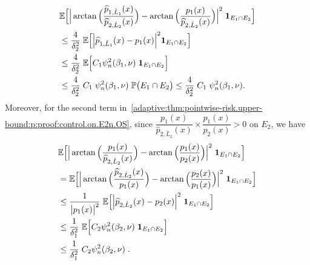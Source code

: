 \documentclass[11pt,a4paper,openany]{article}
\def\E{\mathbb{E}}
\begin{document}
\begin{align*}
	&\E \Big[ \Big| \arctan \Big( \dfrac{ \widehat{p}_{1, \hat L_1}(x)}{ \widehat{p}_{2, \hat L_2}(x)}  \Big)  -  \arctan \Big( \dfrac{p_{1}(x)}{ \widehat{p}_{2, \hat L_2}(x)} \Big) \Big|^{2} \hspace{0.1cm}   \mathbf{1}_{ E_1 \cap E_2 }  \Big]
	\\
	&\leq  \dfrac{4}{\delta_{2}^2} \hspace{0.1cm}  \E \Big[ \Big| \widehat{p}_{1, \hat L_1}(x) - p_{1}(x) \Big|^{2}    \mathbf{1}_{E_1 \cap E_2 } \Big]
	\\
	&\leq  \dfrac{4}{\delta_{2}^2}  \hspace{0.1cm}  \E \Big[   C_{1}    \psi_{n}^2(\beta_{1}, \nu)  \hspace{0.1cm}  \mathbf{1}_{ E_1 \cap  E_2}  \Big]   
	\\
	&\leq  \dfrac{4}{\delta_{2}^2}  \hspace{0.1cm}  C_{1}  \hspace{0.1cm}    \psi_{n}^2(\beta_{1}, \nu )  \hspace{0.1cm} \mathbb{P} \big( E_1\cap  E_2 \big) 
	\leq  \dfrac{4}{\delta_{2}^2}  \hspace{0.1cm}  C_{1}  \hspace{0.1cm}     \psi_{n}^2(\beta_{1}, \nu)  .
\end{align*}
Moreover, for the second term in~\eqref{adaptive:thm:pointwise-risk.upper-bound:p:proof:control.on.E2n.OS}, since $\dfrac{p_{1}(x)}{ \widehat{p}_{2, \hat L_2}(x)} \times  \dfrac{p_{1}(x)}{p_{2}(x)} >  0$ on $E_2$, we have 
\begin{align*}
	&\E \Big[ \Big| \arctan \Big( \dfrac{p_{1}(x)}{ \widehat{p}_{2, \hat L_2}(x)}  \Big)  -  \arctan \Big( \dfrac{p_{1}(x)}{p_{2}(x)} \Big) \Big|^{2}  \hspace{0.1cm}   \mathbf{1}_{E_1 \cap  {E}_{2 }} \Big]
	\\
	&=  \E \Big[ \Big| \arctan \Big( \dfrac{ \widehat{p}_{2, \hat L_2}(x)}{p_{1}(x)}  \Big)  -  \arctan \Big( \dfrac{p_{2}(x)}{p_{1}(x)} \Big) \Big| ^{2}  \hspace{0.1cm}    \mathbf{1}_{E_1 \cap   E_2 } \Big] 	
	\\    
	&\leq  \dfrac{1}{\big| p_{1}(x) \big|^2} \hspace{0.1cm} \E \Big[ \Big|  \widehat{p}_{2, \hat L_2}(x) - p_{2}(x)  \Big| ^{2} \hspace{0.1cm}  \mathbf{1}_{ E_1 \cap  E_2} \Big]
	\\
	&\leq    \dfrac{1}{\delta_{1}^2}  \hspace{0.1cm}  \E \Big[  C_{2}     \psi_{n}^2(\beta_{2}, \nu )    \hspace{0.1cm}  \mathbf{1}_{ E_1 \cap   E_2 }  \Big]
	\\& \leq  \dfrac{1}{\delta_{1}^2}  \hspace{0.1cm}  C_{2}    \psi_{n}^2(\beta_{2}, \nu) \hspace{0.1cm}  .
\end{align*}
\end{document}
